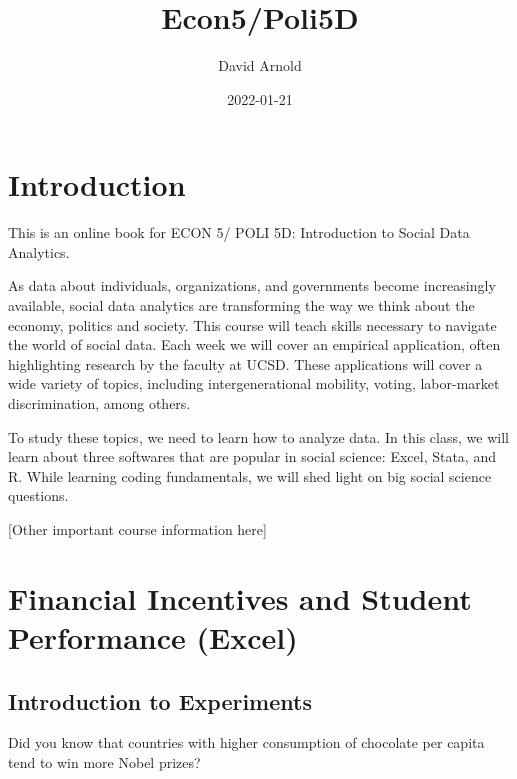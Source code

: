\documentclass[
]{book}
\title{Econ5/Poli5D}
\author{David Arnold}
\date{2022-01-21}
\begin{document}
\maketitle

{
\setcounter{tocdepth}{1}
\tableofcontents
}
\hypertarget{introduction}{%
\chapter*{Introduction}\label{introduction}}

This is an online book for ECON 5/ POLI 5D: Introduction to Social Data Analytics.

As data about individuals, organizations, and governments become increasingly available, social data analytics are transforming the way we think about the economy, politics and society. This course will teach skills necessary to navigate the world of social data. Each week we will cover an empirical application, often highlighting research by the faculty at UCSD. These applications will cover a wide variety of topics, including intergenerational mobility, voting, labor-market discrimination, among others.

To study these topics, we need to learn how to analyze data. In this class, we will learn about three softwares that are popular in social science: Excel, Stata, and R. While learning coding fundamentals, we will shed light on big social science questions.

{[}Other important course information here{]}

\hypertarget{financial-incentives-and-student-performance-excel}{%
\chapter{Financial Incentives and Student Performance (Excel)}\label{financial-incentives-and-student-performance-excel}}

\hypertarget{introduction-to-experiments}{%
\section{Introduction to Experiments}\label{introduction-to-experiments}}

Did you know that countries with higher consumption of chocolate per capita tend to win more Nobel prizes?
\end{document}
